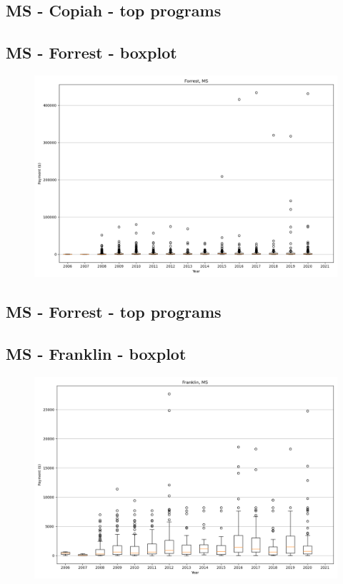 \subsection*{MS - Copiah - top programs}

\newpage
\subsection*{MS - Forrest - boxplot}
\begin{figure}[h]
\centering
\includegraphics[width=7in]{../output/boxplots/counties/Forrest-MS_boxplot.png}
\end{figure}


\subsection*{MS - Forrest - top programs}

\newpage
\subsection*{MS - Franklin - boxplot}
\begin{figure}[h]
\centering
\includegraphics[width=7in]{../output/boxplots/counties/Franklin-MS_boxplot.png}
\end{figure}


